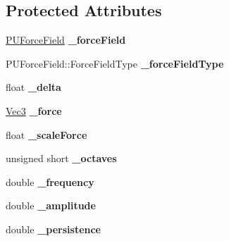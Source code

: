 \subsection*{Protected Attributes}
\begin{DoxyCompactItemize}
\item 
\mbox{\label{classPUForceFieldAffector_ac67861fb1761007a679ad84e3a6d0e86}} 
\hyperlink{classPUForceField}{P\+U\+Force\+Field} {\bfseries \+\_\+force\+Field}
\item 
\mbox{\label{classPUForceFieldAffector_a5c7fac9b2593e094e2d7df9b2d56d1cc}} 
P\+U\+Force\+Field\+::\+Force\+Field\+Type {\bfseries \+\_\+force\+Field\+Type}
\item 
\mbox{\label{classPUForceFieldAffector_a31075fad1b3599e674b1a5345f23d254}} 
float {\bfseries \+\_\+delta}
\item 
\mbox{\label{classPUForceFieldAffector_a56f71b06ebc13c92d67968f02599f238}} 
\hyperlink{classVec3}{Vec3} {\bfseries \+\_\+force}
\item 
\mbox{\label{classPUForceFieldAffector_a793cbf4a9fd1c28b9c83c19c87843ccd}} 
float {\bfseries \+\_\+scale\+Force}
\item 
\mbox{\label{classPUForceFieldAffector_a890b643f6d61195c6bdbac43d01de9c9}} 
unsigned short {\bfseries \+\_\+octaves}
\item 
\mbox{\label{classPUForceFieldAffector_ac534505910713908046f049242d52955}} 
double {\bfseries \+\_\+frequency}
\item 
\mbox{\label{classPUForceFieldAffector_a19a4e9a85d7ad07f2905c1f0f2139870}} 
double {\bfseries \+\_\+amplitude}
\item 
\mbox{\label{classPUForceFieldAffector_ad7dd8a6ea4bf96b5850861c654bbb368}} 
double {\bfseries \+\_\+persistence}
\item 
\mbox{\label{classPUForceFieldAffector_afd462ff58aba1598bd2b7f5aa28de51c}} 

\end{DoxyCompactItemize}
